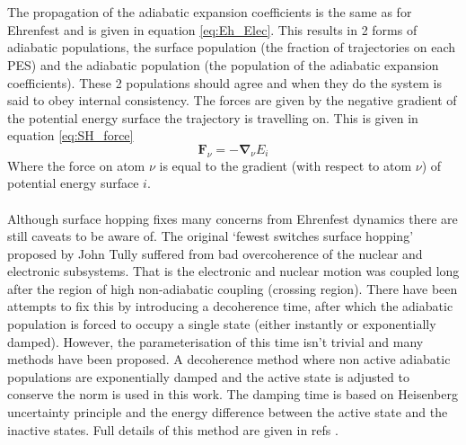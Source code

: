 \\\\
The propagation of the adiabatic expansion coefficients is the same as for Ehrenfest and is given in equation \eqref{eq:Eh_Elec}. This results in 2 forms of adiabatic populations, the surface population (the fraction of trajectories on each PES) and the adiabatic population (the population of the adiabatic expansion coefficients). These 2 populations should agree and when they do the system is said to obey internal consistency. The forces are given by the negative gradient of the potential energy surface the trajectory is travelling on. This is given in equation \eqref{eq:SH_force}
\begin{equation}
  \mathbf{F}_{\nu} = -\mathbf{\nabla}_{\nu} E_{i} 
  \label{eq:SH_force}
\end{equation}
Where the force on atom $\nu$ is equal to the gradient (with respect to atom $\nu$) of potential energy surface $i$.
\\\\
Although surface hopping fixes many concerns from Ehrenfest dynamics there are still caveats to be aware of. The original `fewest switches surface hopping' proposed by John Tully suffered from bad overcoherence of the nuclear and electronic subsystems. That is the electronic and nuclear motion was coupled long after the region of high non-adiabatic coupling (crossing region). There have been attempts to fix this by introducing a decoherence time, after which the adiabatic population is forced to occupy a single state (either instantly or exponentially damped). However, the parameterisation of this time isn't trivial and many methods have been proposed. A decoherence method where non active adiabatic populations are exponentially damped and the active state is adjusted to conserve the norm is used in this work. The damping time is based on Heisenberg uncertainty principle and the energy difference between the active state and the inactive states. Full details of this method are given in refs \cite{Giannini2018Crossover, Carof2017FSSH}.
\\\\
